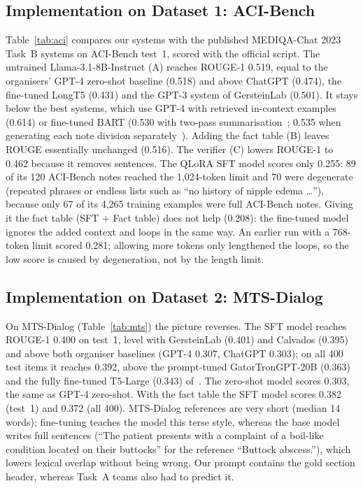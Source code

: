 
\subsection{Implementation on Dataset 1: ACI-Bench}
Table~\ref{tab:aci} compares our systems with the published MEDIQA-Chat 2023 Task~B systems on ACI-Bench
test~1, scored with the official script. The untrained Llama-3.1-8B-Instruct (A) reaches ROUGE-1 0.519,
equal to the organisers' GPT-4 zero-shot baseline (0.518) and above ChatGPT (0.474), the fine-tuned LongT5
(0.431) and the GPT-3 system of GersteinLab (0.501). It stays below the best systems, which use GPT-4 with
retrieved in-context examples (0.614) or fine-tuned BART (0.530 with two-pass summarisation~\cite{sharma2023cadence};
0.535 when generating each note division separately~\cite{yim2023aci}). Adding the fact
table (B) leaves ROUGE essentially unchanged (0.516). The verifier (C) lowers ROUGE-1 to 0.462 because it
removes sentences. The QLoRA SFT model scores only 0.255: 89 of its 120 ACI-Bench notes reached the 1,024-token
limit and 70 were degenerate (repeated phrases or endless lists such as ``no history of nipple edema \ldots''),
because only 67 of its 4,265 training examples were full ACI-Bench notes. Giving it the fact table
(SFT + Fact table) does not help (0.208): the fine-tuned model ignores the added context and loops in the same way.
An earlier run with a 768-token limit scored 0.281; allowing more tokens only lengthened the loops, so the
low score is caused by degeneration, not by the length limit.



\subsection{Implementation on Dataset 2: MTS-Dialog}
On MTS-Dialog (Table~\ref{tab:mts}) the picture reverses. The SFT model reaches ROUGE-1 0.400 on test~1,
level with GersteinLab (0.401) and Calvados (0.395) and above both organiser baselines (GPT-4 0.307,
ChatGPT 0.303); on all 400 test items it reaches 0.392, above the prompt-tuned GatorTronGPT-20B (0.363) and
the fully fine-tuned T5-Large (0.343) of~\cite{lyu2024}. The zero-shot model scores 0.303, the same as GPT-4
zero-shot. With the fact table the SFT model scores 0.382 (test~1) and 0.372 (all 400).
MTS-Dialog references are very short (median 14 words); fine-tuning teaches the model this
terse style, whereas the base model writes full sentences (``The patient presents with a complaint of a
boil-like condition located on their buttocks'' for the reference ``Buttock abscess.''), which lowers lexical
overlap without being wrong. Our prompt contains the gold section header, whereas Task~A teams also had to
predict it.

